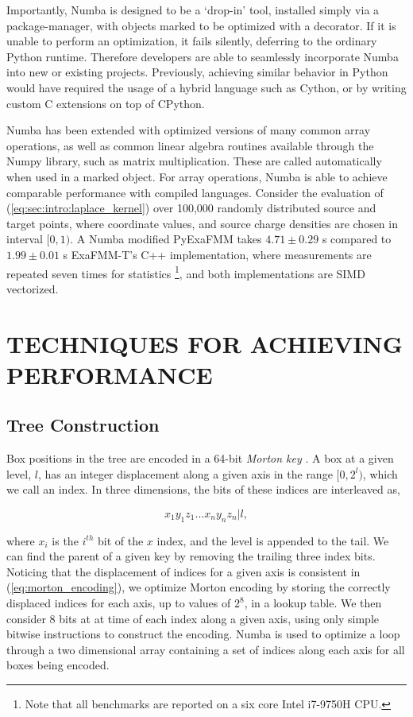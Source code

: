 \documentclass{IEEEcsmag}
\begin{document}
Importantly, Numba is designed to be a `drop-in' tool, installed simply via a package-manager, with objects marked to be optimized with a decorator. If it is unable to perform an optimization, it fails silently, deferring to the ordinary Python runtime. Therefore developers are able to seamlessly incorporate Numba into new or existing projects. Previously, achieving similar behavior in Python would have required the usage of a hybrid language such as Cython, or by writing custom C extensions on top of CPython.

Numba has been extended with optimized versions of many common array operations, as well as common linear algebra routines available through the Numpy library, such as matrix multiplication. These are called automatically when used in a marked object. For array operations, Numba is able to achieve comparable performance with compiled languages. Consider the evaluation of (\ref{eq:sec:intro:laplace_kernel}) over 100,000 randomly distributed source and target points, where coordinate values, and source charge densities are chosen in interval $[0, 1)$. A Numba modified PyExaFMM takes $4.71 \pm 0.29$ s compared to $1.99 \pm 0.01$ s ExaFMM-T's C++ implementation, where measurements are repeated seven times for statistics \footnote[2]{Note that all benchmarks are reported on a six core Intel i7-9750H CPU.}, and both implementations are SIMD vectorized.

\section{TECHNIQUES FOR ACHIEVING PERFORMANCE}

\subsection{Tree Construction}

Box positions in the tree are encoded in a 64-bit \textit{Morton key} \cite{Sundar2007}. A box at a given level, $l$, has an integer displacement along a given axis in the range $[0, 2^l)$, which we call an index. In three dimensions, the bits of these indices are interleaved as,

\begin{equation}
	\label{eq:morton_encoding}
	x_1y_1z_1...x_ny_nz_n | l,
\end{equation}

where $x_i$ is the $i^{th}$ bit of the $x$ index, and the level is appended to the tail. We can find the parent of a given key by removing the trailing three index bits. Noticing that the displacement of indices for a given axis is consistent in (\ref{eq:morton_encoding}), we optimize Morton encoding by storing the correctly displaced indices for each axis, up to values of $2^8$, in a lookup table. We then consider 8 bits at at time of each index along a given axis, using only simple bitwise instructions to construct the encoding. Numba is used to optimize a loop through a two dimensional array containing a set of indices along each axis for all boxes being encoded.
\end{document}
